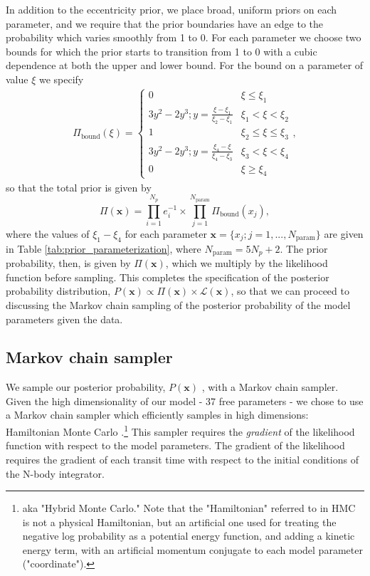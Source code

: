 \documentclass[twocolumn]{aastex63}
\begin{document}
In addition to the eccentricity prior, we place broad, uniform priors on each parameter, and we require that
the prior boundaries have an edge to the probability which varies smoothly from 1 to 0.  For each parameter 
we choose two bounds for which the prior starts to transition from 1 to 0 with a cubic dependence at both
the upper and lower bound.  For the  bound on a parameter of value $\xi$ we specify
\begin{eqnarray}
\Pi_\mathrm{bound}(\xi) = 
\begin{cases}
0 &  \xi {\le} \xi_1\\
3y^2-2y^3; y = \frac{\xi-\xi_1}{\xi_2-\xi_1} & \xi_1 {<} \xi {<} \xi_2\\
1 & \xi_2 {\le} \xi {\le} \xi_3 \\
3y^2-2y^3; y = \frac{\xi_4-\xi}{\xi_4-\xi_3} & \xi_3{<} \xi {<} \xi_4\\
0 &  \xi {\ge} \xi_4
\end{cases},
\end{eqnarray}
so that the total prior is given by
\begin{equation}
    \Pi(\mathbf{x}) = \prod_{i=1}^{N_p} e_i^{-1} {\times} \prod_{j=1}^{N_\mathrm{param}} \Pi_\mathrm{bound}(x_j),
\end{equation}
where the values of $\xi_1{-}\xi_4$ for each parameter
$\mathbf{x} {=} \{x_j; j{=} 1,...,N_\mathrm{param}\}$ are given in Table
\ref{tab:prior_parameterization}, where $N_\mathrm{param} = 5 N_p + 2$.
The prior probability, then, is given by $\Pi(\mathbf{x})$, which we
multiply by the likelihood function before sampling.
This completes the specification of the posterior probability distribution, $P(\mathbf{x}) \propto \Pi(\mathbf{x}) \times \mathcal{L}(\mathbf{x})$,
so that we can proceed to discussing the Markov chain sampling of the posterior probability of the model parameters given the data.

\subsection{Markov chain sampler}

We sample our posterior probability, $P(\mathbf{x})$ ,
with a Markov chain sampler.
Given the high dimensionality of our model - 37 free parameters - we chose to use
a Markov chain sampler which efficiently samples in high dimensions:  Hamiltonian
Monte Carlo \citep[HMC; ][]{Duane1987,Neal2011,Betancourt2017,Monnahan2016}.\footnote{aka "Hybrid Monte Carlo." Note
that the "Hamiltonian" referred to in HMC is not a physical Hamiltonian, but an
artificial one used for treating the negative log probability as a potential
energy function, and adding a kinetic energy term, with an artificial momentum conjugate
to each model parameter ("coordinate").}  This
sampler requires the {\it gradient} of the likelihood function with respect to
the model parameters.  The gradient of the likelihood requires the gradient
of each transit time with respect to the initial conditions of the N-body
integrator.
\end{document}
